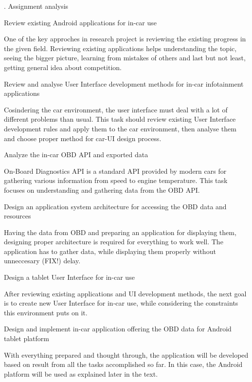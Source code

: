 .
\sec Assignment analysis

\secc Review existing Android applications for in-car use

One of the key approches in research project is reviewing the existing progress in the given field. Reviewing existing applications helps understanding the topic, seeing the bigger picture, learning from mistakes of others and last but not least, getting general idea about competition.

\secc Review and analyse User Interface development methods for in-car infotainment applications

Cosindering the car environment, the user interface must deal with a lot of different problems than usual. This task should review existing User Interface development rules and apply them to the car environment, then analyse them and choose proper method for car-UI design process.

\secc Analyze the in-car OBD API and exported data

On-Board Diagnostics API is a standard API provided by modern cars for gathering various information from speed to engine temperature. This task focuses on understanding and gathering data from the OBD API.

\secc Design an application system architecture for accessing the OBD data and resources

Having the data from OBD and preparing an application for displaying them, designing proper architecture is required for everything to work well. The application has to gather data, while displaying them properly without unneccesary (FIX!) delay.

\secc Design a tablet User Interface for in-car use

After reviewing existing applications and UI development methods, the next goal is to create new User Interface for in-car use, while considering the constraints this environment puts on it.

\secc Design and implement in-car application offering the OBD data for Android tablet platform

With everything prepared and thought through, the application will be developed based on result from all the tasks accomplished so far. In this case, the Android platform will be used as explained later in the text.

